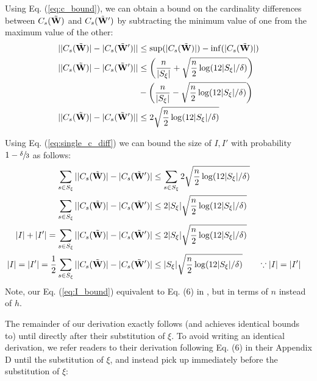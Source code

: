 
Using Eq. (\ref{eq:c_bound}), we can obtain a bound on the cardinality differences between $C_s(\Tilde{{\mathbf{W}}})$ and $C_s(\Tilde{{\mathbf{W}}}')$ by subtracting the minimum value of one from the maximum value of the other:
\begin{align}
    ||C_s(\Tilde{{\mathbf{W}}})| - |C_s(\Tilde{{\mathbf{W}}}')|| &\leq \sup(|C_s(\Tilde{{\mathbf{W}}})|) - \inf(|C_s(\Tilde{{\mathbf{W}}})|) \\
    ||C_s(\Tilde{{\mathbf{W}}})| - |C_s(\Tilde{{\mathbf{W}}}')|| &\leq \left(\frac{n}{|S_\xi|} + \sqrt{\frac{n}{2}\log(12|S_\xi|/\delta)}\right)\notag \\
    &- \left(\frac{n}{|S_\xi|} - \sqrt{\frac{n}{2}\log(12|S_\xi|/\delta)}\right) \\
    ||C_s(\Tilde{{\mathbf{W}}})| - |C_s(\Tilde{{\mathbf{W}}}')|| &\leq 2\sqrt{\frac{n}{2}\log(12|S_\xi|/\delta)}\label{eq:single_c_diff}
\end{align}

Using Eq. (\ref{eq:single_c_diff}) we can bound the size of $I,I'$ with probability $1-\sfrac{\delta}{3}$ as follows:
\begin{align}
    \sum_{s\in S_\xi} ||C_s(\Tilde{{\mathbf{W}}})| - |C_s(\Tilde{{\mathbf{W}}}')| &\leq \sum_{s\in S_\xi} 2\sqrt{\frac{n}{2}\log(12|S_\xi|/\delta)} \\
    \sum_{s\in S_\xi} ||C_s(\Tilde{{\mathbf{W}}})| - |C_s(\Tilde{{\mathbf{W}}}')| &\leq 2|S_\xi|\sqrt{\frac{n}{2}\log(12|S_\xi|/\delta)} \\
    |I| + |I'| = \sum_{s\in S_\xi} ||C_s(\Tilde{{\mathbf{W}}})| - |C_s(\Tilde{{\mathbf{W}}}')| &\leq 2|S_\xi|\sqrt{\frac{n}{2}\log(12|S_\xi|/\delta)} \\
    |I| = |I'| = \frac{1}{2} \sum_{s\in S_\xi} ||C_s(\Tilde{{\mathbf{W}}})| - |C_s(\Tilde{{\mathbf{W}}}')| &\leq |S_\xi|\sqrt{\frac{n}{2}\log(12|S_\xi|/\delta)} && \because |I|=|I'|\label{eq:I_bound}
\end{align}
Note, our Eq. (\ref{eq:I_bound}) equivalent to Eq. (6) in \cite{entezari2021role}, but in terms of $n$ instead of $h$. 

The remainder of our derivation exactly follows (and achieves identical bounds to) \cite{entezari2021role} until directly after their substitution of $\xi$. To avoid writing an identical derivation, we refer readers to their derivation following Eq. (6) in their Appendix D until the substitution of $\xi$, and instead pick up immediately before the substitution of $\xi$:

